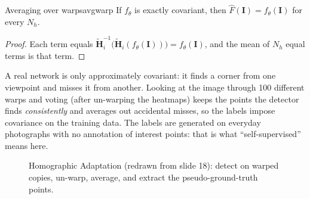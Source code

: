 \documentclass[11pt,a4paper]{article}
\begin{document}
\begin{lemma}{Averaging over warps}{avgwarp}
If $f_\theta$ is exactly covariant, then $\hat F(\bm I)=f_\theta(\bm I)$ for every $N_h$.
\end{lemma}
\begin{proof}
Each term equals $\tilde{\bm H}_i^{-1}\bigl(\tilde{\bm H}_i(f_\theta(\bm I))\bigr)=f_\theta(\bm I)$, and the mean of $N_h$ equal terms is that term.
\end{proof}

\begin{intuition}
A real network is only approximately covariant: it finds a corner from one viewpoint and misses it from another. Looking at the image through
100 different warps and voting (after un-warping the heatmaps) keeps the points the detector finds \emph{consistently} and averages out accidental
misses, so the labels impose covariance on the training data. The labels are generated on everyday photographs with no annotation of
interest points: that is what ``self-supervised'' means here.
\end{intuition}

\begin{figure}[H]
\centering
{}
\caption{Homographic Adaptation (redrawn from slide 18): detect on warped copies, un-warp, average, and extract the pseudo-ground-truth points.}
\end{figure}
\end{document}
